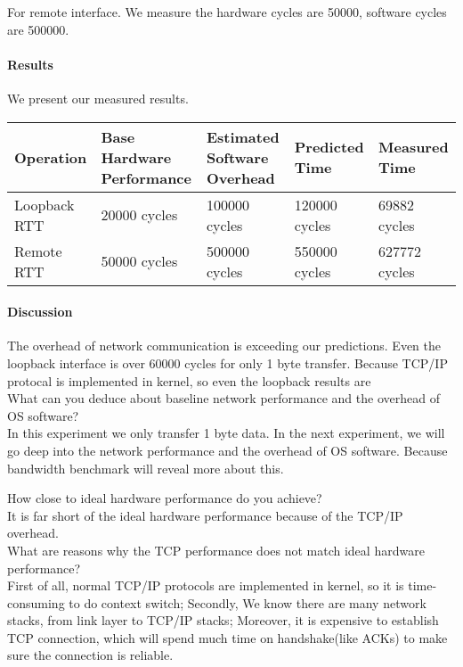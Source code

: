 For remote interface. We measure the hardware cycles are 50000, software cycles are 500000.

\paragraph{Results}
We present our measured results.

\begin{center}
\begin{tabular}{| p{3cm} | p{3cm} | p{3cm} | p{3cm} | p{3cm} |}
Operation   & Base Hardware Performance  & Estimated Software Overhead  & Predicted Time  & Measured Time   \\
\hline
Loopback RTT & 20000 cycles& 100000 cycles& 120000 cycles& 69882 cycles\\
Remote RTT & 50000 cycles& 500000 cycles& 550000 cycles& 627772 cycles\\
\end{tabular}
\end{center}

\paragraph{Discussion}
The overhead of network communication is exceeding our predictions. Even the loopback interface is over 60000 cycles for only 1 byte transfer.
Because TCP/IP protocal is implemented in kernel, so even the loopback results are \\

What can you deduce about baseline network performance and the overhead of OS software?  \\
In this experiment we only transfer 1 byte data. In the next experiment, we will go deep into the network performance and the overhead of OS software. Because bandwidth benchmark will reveal more about this.

How close to ideal hardware performance do you achieve? \\
It is far short of the ideal hardware performance because of the TCP/IP overhead.\\


What are reasons why the TCP performance does not match ideal hardware performance?  \\
First of all, normal TCP/IP protocols are implemented in kernel, so it is time-consuming to do context switch;
Secondly, We know there are many network stacks, from link layer to TCP/IP stacks;
Moreover, it is expensive to establish TCP connection, which will spend much time on handshake(like ACKs) to make sure the connection is reliable.

